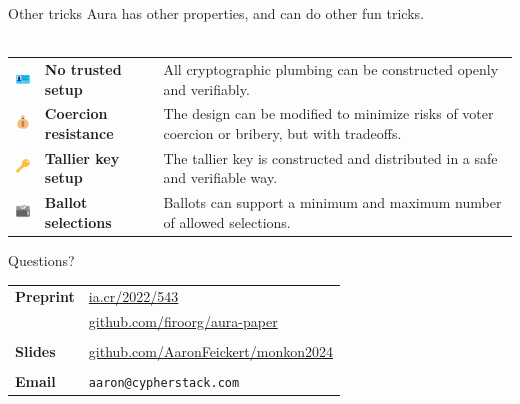 \documentclass[aspectratio=169]{beamer}
\begin{document}
\begin{frame}{Other tricks}
    Aura has other properties, and can do other fun tricks. \\~\\

    \begin{table}
        \centering
        \begin{tabular}{>{\arraybackslash}m{40px} >{\arraybackslash}m{100px} >{\arraybackslash}m{220px}}
            \includegraphics[width=30px]{images/id.png} & \textbf{No trusted setup} & All cryptographic plumbing can be constructed openly and verifiably. \\
            \includegraphics[width=30px]{images/money.png} & \textbf{Coercion resistance} & The design can be modified to minimize risks of voter coercion or bribery, but with tradeoffs. \\
            \includegraphics[width=30px]{images/key.png} & \textbf{Tallier key setup} & The tallier key is constructed and distributed in a safe and verifiable way. \\
            \includegraphics[width=30px]{images/ballot.png} & \textbf{Ballot selections} & Ballots can support a minimum and maximum number of allowed selections. \\
        \end{tabular}
    \end{table}
\end{frame}

\begin{frame}{Questions?}
	\Large
	\begin{center}
		\begin{tabular}{ll}
			\textbf{Preprint} & \url{ia.cr/2022/543} \\
			& \url{github.com/firoorg/aura-paper} \\
			\\
			\textbf{Slides} & \url{github.com/AaronFeickert/monkon2024} \\
			\\
			\textbf{Email} & \texttt{aaron@cypherstack.com}
		\end{tabular}
	\end{center}
\end{frame}
\end{document}
